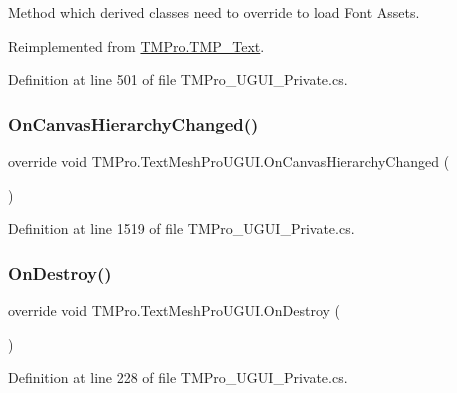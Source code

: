 Method which derived classes need to override to load Font Assets. 



Reimplemented from \mbox{\hyperlink{class_t_m_pro_1_1_t_m_p___text_a02b60cb23d3eceb1ea52a61f194d8bec}{T\+M\+Pro.\+T\+M\+P\+\_\+\+Text}}.



Definition at line 501 of file T\+M\+Pro\+\_\+\+U\+G\+U\+I\+\_\+\+Private.\+cs.

\mbox{\label{class_t_m_pro_1_1_text_mesh_pro_u_g_u_i_af06e3849f8cdb350ef904848487afe31}} 
\subsubsection{\texorpdfstring{OnCanvasHierarchyChanged()}{OnCanvasHierarchyChanged()}}
{\footnotesize\ttfamily override void T\+M\+Pro.\+Text\+Mesh\+Pro\+U\+G\+U\+I.\+On\+Canvas\+Hierarchy\+Changed (\begin{DoxyParamCaption}{ }\end{DoxyParamCaption})\hspace{0.3cm}{\ttfamily [protected]}}



Definition at line 1519 of file T\+M\+Pro\+\_\+\+U\+G\+U\+I\+\_\+\+Private.\+cs.

\mbox{\label{class_t_m_pro_1_1_text_mesh_pro_u_g_u_i_a48779da83c94351d0994aac6461bda96}} 
\subsubsection{\texorpdfstring{OnDestroy()}{OnDestroy()}}
{\footnotesize\ttfamily override void T\+M\+Pro.\+Text\+Mesh\+Pro\+U\+G\+U\+I.\+On\+Destroy (\begin{DoxyParamCaption}{ }\end{DoxyParamCaption})\hspace{0.3cm}{\ttfamily [protected]}}



Definition at line 228 of file T\+M\+Pro\+\_\+\+U\+G\+U\+I\+\_\+\+Private.\+cs.


